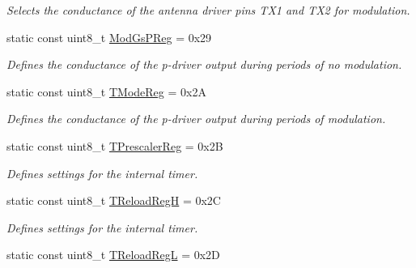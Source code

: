 \begin{DoxyCompactItemize}
\begin{DoxyCompactList}\small\item\em Selects the conductance of the antenna driver pins T\+X1 and T\+X2 for modulation. \end{DoxyCompactList}\item 
\mbox{\label{classMFRC522_a94e96f5d58f9f52756235366a0c8a53a}} 
static const uint8\+\_\+t \hyperlink{classMFRC522_a94e96f5d58f9f52756235366a0c8a53a}{Mod\+Gs\+P\+Reg} = 0x29
\begin{DoxyCompactList}\small\item\em Defines the conductance of the p-\/driver output during periods of no modulation. \end{DoxyCompactList}\item 
\mbox{\label{classMFRC522_a3caf3862116749118e52431d31048f68}} 
static const uint8\+\_\+t \hyperlink{classMFRC522_a3caf3862116749118e52431d31048f68}{T\+Mode\+Reg} = 0x2A
\begin{DoxyCompactList}\small\item\em Defines the conductance of the p-\/driver output during periods of modulation. \end{DoxyCompactList}\item 
\mbox{\label{classMFRC522_a748558ee5f116ea8c16488dc42a9009e}} 
static const uint8\+\_\+t \hyperlink{classMFRC522_a748558ee5f116ea8c16488dc42a9009e}{T\+Prescaler\+Reg} = 0x2B
\begin{DoxyCompactList}\small\item\em Defines settings for the internal timer. \end{DoxyCompactList}\item 
\mbox{\label{classMFRC522_adb9c85f5225d44862e74223efaea249d}} 
static const uint8\+\_\+t \hyperlink{classMFRC522_adb9c85f5225d44862e74223efaea249d}{T\+Reload\+RegH} = 0x2C
\begin{DoxyCompactList}\small\item\em Defines settings for the internal timer. \end{DoxyCompactList}\item 
\mbox{\label{classMFRC522_ab8ee05c49c5895b521f35b413c8832c5}} 
static const uint8\+\_\+t \hyperlink{classMFRC522_ab8ee05c49c5895b521f35b413c8832c5}{T\+Reload\+RegL} = 0x2D

\end{DoxyCompactItemize}
